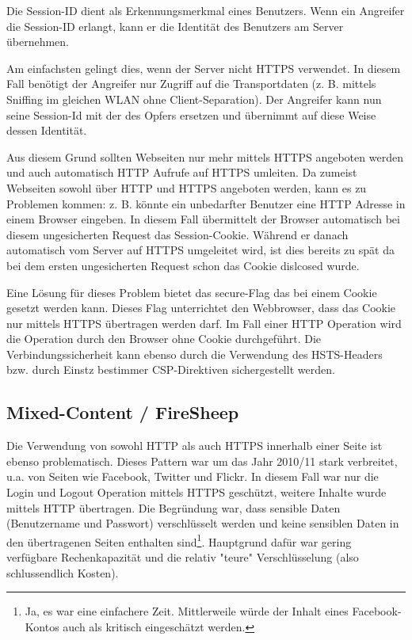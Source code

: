Die Session-ID dient als Erkennungsmerkmal eines Benutzers. Wenn ein Angreifer die Session-ID erlangt, kann er die Identität des Benutzers am Server übernehmen.

Am einfachsten gelingt dies, wenn der Server nicht HTTPS verwendet. In diesem Fall benötigt der Angreifer nur Zugriff auf die Transportdaten (z. B. mittels Sniffing im gleichen WLAN ohne Client-Separation). Der Angreifer kann nun seine Session-Id mit der des Opfers ersetzen und übernimmt auf diese Weise dessen Identität.

Aus diesem Grund sollten Webseiten nur mehr mittels HTTPS angeboten werden und auch automatisch HTTP Aufrufe auf HTTPS umleiten. Da zumeist Webseiten sowohl über HTTP und HTTPS angeboten werden, kann es zu Problemen kommen: z. B. könnte ein unbedarfter Benutzer eine HTTP Adresse in einem Browser eingeben. In diesem Fall übermittelt der Browser automatisch bei diesem ungesicherten Request das Session-Cookie. Während er danach automatisch vom Server auf HTTPS umgeleitet wird, ist dies bereits zu spät da bei dem ersten ungesicherten Request schon das Cookie dislcosed wurde.

Eine Lösung für dieses Problem bietet das secure-Flag das bei einem Cookie gesetzt werden kann. Dieses Flag unterrichtet den Webbrowser, dass das Cookie nur mittels HTTPS übertragen werden darf. Im Fall einer HTTP Operation wird die Operation durch den Browser ohne Cookie durchgeführt.  Die Verbindungssicherheit kann ebenso durch die Verwendung des HSTS-Headers bzw. durch Einstz bestimmer CSP-Direktiven sichergestellt werden.

\subsection{Mixed-Content / FireSheep}

Die Verwendung von sowohl HTTP als auch HTTPS innerhalb einer Seite ist ebenso problematisch. Dieses Pattern war um das Jahr 2010/11 stark verbreitet, u.a. von Seiten wie Facebook, Twitter und Flickr. In diesem Fall war nur die Login und Logout Operation mittels HTTPS geschützt, weitere Inhalte wurde mittels HTTP übertragen. Die Begründung war, dass sensible Daten (Benutzername und Passwort) verschlüsselt werden und keine sensiblen Daten in den übertragenen Seiten enthalten sind\footnote{Ja, es war eine einfachere Zeit. Mittlerweile würde der Inhalt eines Facebook-Kontos auch als kritisch eingeschätzt werden.}. Hauptgrund dafür war gering verfügbare Rechenkapazität und die relativ "teure" Verschlüsselung (also schlussendlich Kosten).

